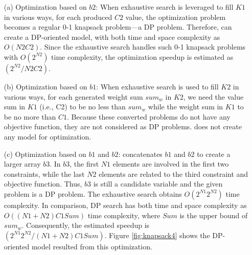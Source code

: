  \begin{enumerate}
     \item[(a)] Optimization based on $b2$: %
     When exhaustive search is leveraged to
     fill $K1$ in various ways, for each produced $C2$ value, the optimization problem becomes a regular 0-1 knapsack problem---a DP problem. Therefore, \tool can create a DP-oriented model, with both time and space complexity as $O(N2C2)$. Since the exhaustive search handles such 0-1 knapsack problems with $O(2^{N2})$ time complexity, the optimization speedup is estimated as $(2^{N2}/N2C2)$.
     
      \item[(b)] Optimization based on $b1$: When exhaustive search is used to fill $K2$ in various ways, for each generated weight sum $sum_w$ in $K2$, we need the value sum in $K1$ (i.e., C2) to be no less than $sum_w$ while the weight sum in $K1$ to be no more than $C1$. Because these converted problems do not have any objective function, they are not considered as DP problems. \tool does not create any model for optimization. 
     
     \item[(c)] Optimization based on $b1$ and $b2$: \tool concatenates $b1$ and $b2$ to create a larger array $b3$. In $b3$, the first $N1$ elements are involved in the first two constraints, while the last $N2$ elements are related to the third constraint and objective function. Thus, $b3$ is still a candidate variable and the given problem is a DP problem. The exhaustive search obtains $O(2^{N1}2^{N2})$ time complexity. In comparison, DP search has both time and space complexity as 
     $O((N1+N2)C1Sum)$ time complexity, where $Sum$ is the upper bound of $sum_w$. Consequently, the estimated speedup is $(2^{N1}2^{N2}/(N1+N2)C1Sum)$. Figure \ref{fig:knapsack4} shows the DP-oriented model resulted from this optimization.
 \end{enumerate}
 
